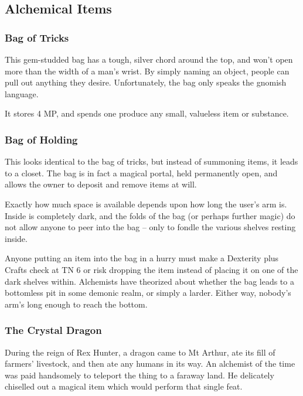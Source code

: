\begin{multicols}{2}

\subsection{Alchemical Items}

\subsubsection{Bag of Tricks}
This gem-studded bag has a tough, silver chord around the top, and won't open more than the width of a man's wrist.  By simply naming an object, people can pull out anything they desire.  Unfortunately, the bag only speaks the gnomish language.

It stores 4 MP, and spends one produce any small, valueless item or substance.

\subsubsection{Bag of Holding}
This looks identical to the bag of tricks, but instead of summoning items, it leads to a closet.  The bag is in fact a magical portal, held permanently open, and allows the owner to deposit and remove items at will.

Exactly how much space is available depends upon how long the user's arm is.  Inside is completely dark, and the folds of the bag (or perhaps further magic) do not allow anyone to peer into the bag -- only to fondle the various shelves resting inside.

Anyone putting an item into the bag in a hurry must make a Dexterity plus Crafts check at TN 6 or risk dropping the item instead of placing it on one of the dark shelves within.  Alchemists have theorized about whether the bag leads to a bottomless pit in some demonic realm, or simply a larder.  Either way, nobody's arm's long enough to reach the bottom.

\subsubsection{The Crystal Dragon}
During the reign of Rex Hunter, a dragon came to Mt Arthur, ate its fill of farmers' livestock, and then ate any humans in its way.  An alchemist of the time was paid handsomely to teleport the thing to a faraway land.  He delicately chiselled out a magical item which would perform that single feat.  


\end{multicols}
